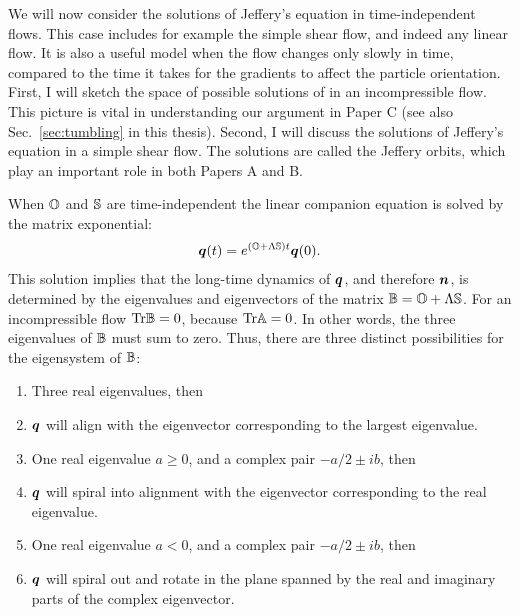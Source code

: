 \documentclass[thesis.tex]{subfiles}
\begin{document}
We will now consider the solutions of Jeffery's equation in time-independent flows. This case includes for example the simple shear flow, and indeed any linear flow. It is also a useful model when the flow changes only slowly in time, compared to the time it takes for the gradients to affect the particle orientation. First, I will sketch the space of possible solutions of  in an incompressible flow. This picture is vital in understanding our argument in Paper C (see also Sec.~\ref{sec:tumbling} in this thesis). Second, I will discuss the solutions of Jeffery's equation in a simple shear flow. The solutions are called the Jeffery orbits, which play an important role in both Papers A and B.

When $\mathbb{O}$ and $\mathbb{S}$ are time-independent the linear companion equation  is solved by the matrix exponential:
\begin{align*}
		\mbox{\boldmath$q$}(t) = e^{(\mathbb{O} + \Lambda \mathbb{S})t}\mbox{\boldmath$q$}(0).
\end{align*}
This solution implies that the long-time dynamics of $\mbox{\boldmath$q$}$, and therefore $\mbox{\boldmath$n$}$, is determined by the eigenvalues and eigenvectors of the matrix $\mathbb{B} = \mathbb{O} + \Lambda\mathbb{S}$. For an incompressible flow $\mbox{Tr}\mathbb{B}=0$, because $\mbox{Tr}\mathbb{A}=0$. In other words, the three eigenvalues of $\mathbb{B}$ must sum to zero. Thus, there are three distinct possibilities for the eigensystem of $\mathbb{B}$:
\begin{enumerate}
	\item Three real eigenvalues, then
	\item[] $\mbox{\boldmath$q$}$ will align with the eigenvector corresponding to the largest eigenvalue.
	\item One real eigenvalue $a\ge0$, and a complex pair $-a/2 \pm ib$, then
	\item[] $\mbox{\boldmath$q$}$ will spiral into alignment with the eigenvector corresponding to the real eigenvalue.
	\item One real eigenvalue $a<0$, and a complex pair $-a/2 \pm ib$, then
	\item[] $\mbox{\boldmath$q$}$ will spiral out and rotate in the plane spanned by the real and imaginary parts of the complex eigenvector.
\end{enumerate}
\end{document}
